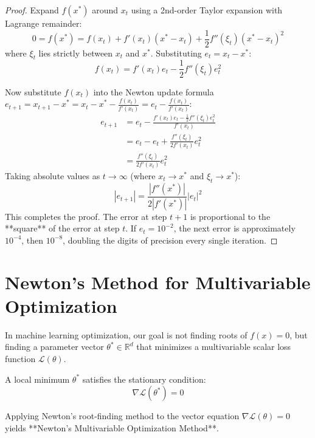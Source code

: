 \begin{proof}
Expand $f(x^*)$ around $x_t$ using a 2nd-order Taylor expansion with Lagrange remainder:
\begin{equation}
0 = f(x^*) = f(x_t) + f'(x_t)(x^* - x_t) + \frac{1}{2} f''(\xi_t)(x^* - x_t)^2
\end{equation}
where $\xi_t$ lies strictly between $x_t$ and $x^*$. Substituting $e_t = x_t - x^*$:
\begin{equation}
f(x_t) = f'(x_t) e_t - \frac{1}{2} f''(\xi_t) e_t^2
\end{equation}

Now substitute $f(x_t)$ into the Newton update formula $e_{t+1} = x_{t+1} - x^* = x_t - x^* - \frac{f(x_t)}{f'(x_t)} = e_t - \frac{f(x_t)}{f'(x_t)}$:
\begin{align}
e_{t+1} &= e_t - \frac{f'(x_t) e_t - \frac{1}{2} f''(\xi_t) e_t^2}{f'(x_t)} \\
&= e_t - e_t + \frac{f''(\xi_t)}{2 f'(x_t)} e_t^2 \\
&= \frac{f''(\xi_t)}{2 f'(x_t)} e_t^2
\end{align}
Taking absolute values as $t \to \infty$ (where $x_t \to x^*$ and $\xi_t \to x^*$):
\begin{equation}
|e_{t+1}| = \frac{|f''(x^*)|}{2 |f'(x^*)|} |e_t|^2
\end{equation}
This completes the proof. The error at step $t+1$ is proportional to the **square** of the error at step $t$. If $e_t = 10^{-2}$, the next error is approximately $10^{-4}$, then $10^{-8}$, doubling the digits of precision every single iteration.
\end{proof}


\section{Newton's Method for Multivariable Optimization}
In machine learning optimization, our goal is not finding roots of $f(x)=0$, but finding a parameter vector $\theta^* \in \mathbb{R}^d$ that minimizes a multivariable scalar loss function $\mathcal{L}(\theta)$.

A local minimum $\theta^*$ satisfies the stationary condition:
\begin{equation}
\nabla \mathcal{L}(\theta^*) = 0
\end{equation}

Applying Newton's root-finding method to the vector equation $\nabla \mathcal{L}(\theta) = 0$ yields **Newton's Multivariable Optimization Method**.

